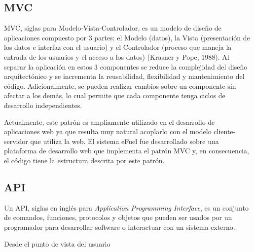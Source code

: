 \subsection{MVC}
MVC, siglas para Modelo-Vista-Controlador, es un modelo de diseño de aplicaciones compuesto por 3 partes: el Modelo (datos), la Vista (presentación de los datos e interfaz con el usuario) y el Controlador (proceso que maneja la entrada de los usuarios y el acceso a los datos) (Krasner y Pope, 1988). Al separar la aplicación en estos 3 componentes se reduce la complejidad del diseño arquitectónico y se incrementa la reusabilidad, flexibilidad y mantenimiento del código. Adicionalmente, se pueden realizar cambios sobre un componente sin afectar a los demás, lo cual permite que cada componente tenga ciclos de desarrollo independientes.

Actualmente, este patrón es ampliamente utilizado en el desarrollo de aplicaciones web ya que resulta muy natural acoplarlo con el modelo cliente-servidor que utiliza la web. El sistema eFuel fue desarrollado sobre una plataforma de desarrollo web que implementa el patrón MVC y, en consecuencia, el código tiene la estructura descrita por este patrón.

\subsection{API}
Un API, siglas en inglés para \textit{Application Programming Interface}, es un conjunto de comandos, funciones, protocolos y objetos que pueden ser usados por un programador para desarrollar software o interactuar con un sistema externo.

Desde el punto de vista del usuario
